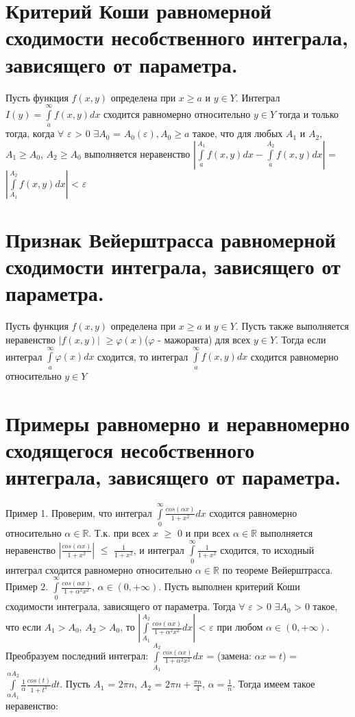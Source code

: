 \documentclass[12pt, a4paper]{article}
\begin{document}
\section{Критерий Коши равномерной сходимости несобственного интеграла, зависящего от параметра.}
Пусть функция $f(x, y)$ определена при $x \geq a$ и $y \in Y$.
Интеграл $I(y) = \int\limits_a^{\infty} f(x, y)dx$ сходится равномерно относительно
$y \in Y$ тогда и только тогда, когда $\forall$ $\varepsilon$ > 0 $\exists 
A_0$ = $A_0(\varepsilon), A_0 \geq a$ такое, что для любых $A_1$ и $A_2$, 
$A_1 \geq A_0$, $A_2 \geq A_0$ выполняется неравенство 
$|\int\limits_a^{A_1} f(x, y)dx - \int\limits_a^{A_2} f(x, y)dx |$  = 
$|\int\limits_{A_1}^{A_2} f(x, y)dx|$ < $\varepsilon$

\section{Признак Вейерштрасса равномерной сходимости интеграла, зависящего от параметра.}
Пусть функция $f(x, y)$ определена при $x \geq a$ и $y \in Y$.
Пусть также выполняется неравенство $|f(x, y)|$ $\geq \varphi(x)$($\varphi$
- мажоранта) для всех $y \in Y$. Тогда если интеграл $\int\limits_a^{\infty}
\varphi(x)dx$ сходится, то интеграл $\int\limits_a^{\infty}f(x, y)dx$
сходится равномерно относительно $y \in Y$

\section{Примеры равномерно и неравномерно сходящегося несобственного интеграла, зависящего от параметра.}
Пример 1.
\newline
Проверим, что интеграл $\int\limits_0^{\infty}\frac{cos(\alpha x)}{1 + x^2}dx$
сходится равномерно относительно $\alpha \in \mathbb{R}$.
Т.к. при всех $x$ $\geq$ $0$ и при всех $\alpha \in \mathbb{R}$ выполняется
неравенство $|\frac{cos(\alpha x)}{1 + x^2}|$ $\leq$ $\frac{1}{1 + x^2}$,
и интеграл $\int\limits_0^{\infty}\frac{1}{1 + x^2}$ сходится, то исходный интеграл
сходится равномерно относительно $\alpha \in \mathbb{R}$ по теореме Вейерштрасса.
\newline
Пример 2.
\newline
$\int\limits_0^{\infty}\frac{cos(\alpha x)}{1 + \alpha^2 x^2}$, $\alpha \in
(0, +\infty)$. Пусть выполнен критерий Коши сходимости интеграла, зависящего
от параметра. Тогда $\forall$ $\varepsilon$ > 0 $\exists A_0$ > 0 такое, что
если $A_1 > A_0$, $A_2 > A_0$, то $| \int\limits_{A_1}^{A_2}\frac{cos(\alpha x)}
{1 + \alpha ^ 2 x^2}dx|$ < $\varepsilon$ при любом $\alpha \in 
(0, + \infty)$. Преобразуем последний интеграл: $\int\limits_{A_1}^{A_2}\frac{cos(\alpha x)}
{1 + \alpha ^ 2 x^2}dx$ = (замена: $\alpha x = t$) = $\int\limits_{\alpha A_1}^
{\alpha A_2}\frac{1}{\alpha}\frac{cos(t)}{1 + t^2}dt$. Пусть $A_1$ = $2\pi n$,
$A_2$ = $2\pi n + \frac{\pi n}{4}$, $\alpha = \frac{1}{n}$. Тогда имеем такое
неравенство: 
\end{document}
